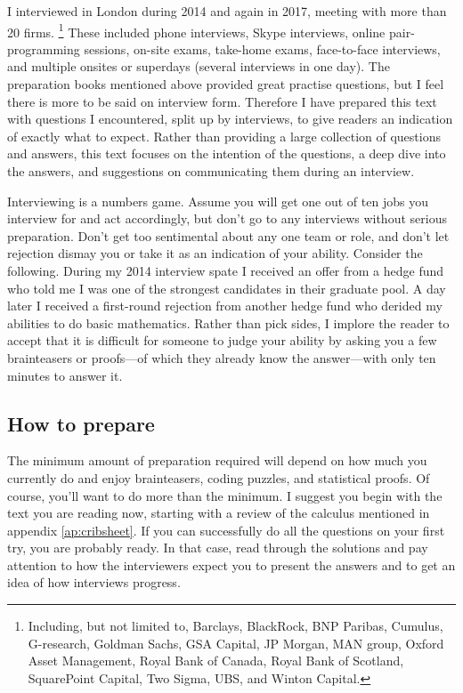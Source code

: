 \documentclass[a4paper]{article}
\begin{document}
I interviewed in London during 2014 and again in 2017,
meeting with more than 20 firms.%
\footnote{Including, but not limited to,
  Barclays,
  BlackRock,
  BNP Paribas,
  Cumulus,
  G-research,
  Goldman Sachs,
  GSA Capital,
  JP Morgan,
  MAN group,
  Oxford Asset Management,
  Royal Bank of Canada,
  Royal Bank of Scotland,
  SquarePoint Capital,
  Two Sigma,
  UBS,
and
  Winton Capital.
}
These included phone interviews, Skype interviews, online pair-programming sessions, on-site exams, take-home exams, face-to-face interviews, and multiple onsites or superdays (several interviews in one day).
The preparation books mentioned above provided great practise questions, but I feel there is more to be said on interview form.
Therefore I have prepared this text with questions I encountered, split up by interviews, to give readers an indication of exactly what to expect.
Rather than providing a large collection of questions and answers, this text focuses on the intention of the questions, a deep dive into the answers, and suggestions on communicating them during an interview.

Interviewing is a numbers game.
Assume you will get one out of ten jobs you interview for and act accordingly, but don't go to any interviews without serious preparation.
Don't get too sentimental about any one team or role, and don't let rejection dismay you or take it as an indication of your ability.
Consider the following.
During my 2014 interview spate I received an offer from a hedge fund who told me I was one of the strongest candidates in their graduate pool.
A day later I received a first-round rejection from another hedge fund who derided my abilities to do basic mathematics.
Rather than pick sides, I implore the reader to accept that it is difficult for someone to judge your ability by asking you a few brainteasers or proofs---of which they already know the answer---with only ten minutes to answer it.

{}
\subsection*{How to prepare}

The minimum amount of preparation required will depend on how much you currently do and enjoy brainteasers, coding puzzles, and statistical proofs.
Of course, you'll want to do more than the minimum.
I suggest you begin with the text you are reading now, starting with a review of the calculus mentioned in appendix \ref{ap:cribsheet}.
If you can successfully do all the questions on your first try, you are probably ready.
In that case, read through the solutions and pay attention to how the interviewers expect you to present the answers and to get an idea of how interviews progress.
\end{document}
